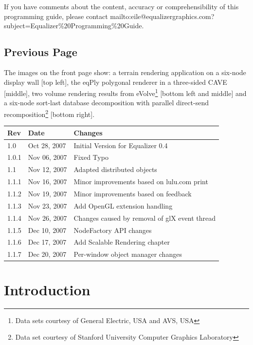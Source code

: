 \documentclass[10pt,a4]{scrartcl}
\begin{document}
If you have comments about the content, accuracy or comprehensibility of
this programming guide, please contact
{mailto:eile@equalizergraphics.com?subject=Equalizer\%20Programming\%20Guide}.

\vfill

\subsection*{Previous Page}

The images on the front page show: a terrain rendering application on a
six-node display wall [top left], the \textsf{eqPly} polygonal renderer
in a three-sided CAVE [middle], two volume rendering results from
eVolve\footnote{Data sets courtesy of General Electric, USA and AVS,
  USA} [bottom left and middle] and a six-node sort-last database
decomposition with parallel direct-send recomposition\footnote{Data set
  courtesy of Stanford University Computer Graphics Laboratory} [bottom
right].

\clearpage
\thispagestyle{empty}
\tableofcontents
\vfill{\center\begin{tabularx}{\textwidth}{|l|l|X|}
    \hline
    \bf Rev & \bf Date     & \bf Changes \\
    \hline
    1.0     & Oct 28, 2007 & Initial Version for Equalizer 0.4\\
    1.0.1   & Nov 06, 2007 & Fixed Typo\\
    1.1     & Nov 12, 2007 & Adapted distributed objects\\
    1.1.1   & Nov 16, 2007 & Minor improvements based on lulu.com print\\
    1.1.2   & Nov 19, 2007 & Minor improvements based on feedback\\
    1.1.3   & Nov 23, 2007 & Add OpenGL extension handling\\
    1.1.4   & Nov 26, 2007 & Changes caused by removal of glX event thread\\
    1.1.5   & Dec 10, 2007 & NodeFactory API changes\\
    1.1.6   & Dec 17, 2007 & Add Scalable Rendering chapter\\
    1.1.7   & Dec 20, 2007 & Per-window object manager changes\\
    \hline
  \end{tabularx}}
\thispagestyle{empty}
\clearpage


\section{Introduction}
\end{document}
